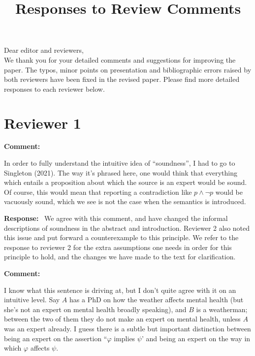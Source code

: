 \documentclass[12pt]{article}
\title{%
    Responses to Review Comments
}
\author{}
\date{}
\newenvironment{comment}{
    \noindent\textbf{Comment:}\
    \em
}{\vspace{5mm}}
\newenvironment{response}{
    \noindent\textbf{Response:}\
}{\vspace{5mm}}
\renewcommand{\phi}{\varphi}
\begin{document}
\maketitle

Dear editor and reviewers,\\

We thank you for your detailed comments and suggestions for improving the
paper. The typos, minor points on presentation and bibliographic errors raised
by both reviewers have been fixed in the revised paper. Please find more
detailed responses to each reviewer below.

\section*{Reviewer 1}

\begin{comment}
    In order to fully understand the intuitive idea of ``soundness'', I had to
    go to Singleton (2021). The way it’s phrased here, one would think that
    everything which entails a proposition about which the source is an expert
    would be sound. Of course, this would mean that reporting a contradiction
    like $p \land \neg p$ would be vacuously sound, which we see is not the
    case when the semantics is introduced.
\end{comment}

\begin{response}
    We agree with this comment, and have changed the informal descriptions of
    soundness in the abstract and introduction. Reviewer 2 also noted this
    issue and put forward a counterexample to this principle. We refer to the
    response to reviewer 2 for the extra assumptions one needs in order for
    this principle to hold, and the changes we have made to the text for
    clarification.
\end{response}

\begin{comment}
    I know what this sentence is driving at, but I don’t quite agree with it on
    an intuitive level. Say $A$ has a PhD on how the weather affects mental
    health (but she's not an expert on mental health broadly speaking), and $B$
    is a weatherman; between the two of them they do not make an expert on
    mental health, unless $A$ was an expert already.  I guess there is a subtle
    but important distinction between being an expert on the assertion ``$\phi$
    implies $\psi$’ and being an expert on the way in which $\phi$ affects
    $\psi$.
\end{comment}
\end{document}
